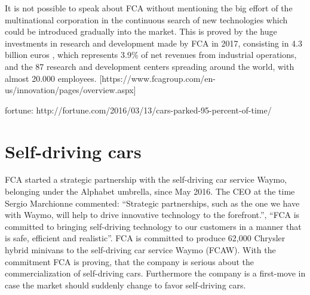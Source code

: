      

It is not possible to speak about FCA without mentioning the big effort of the multinational corporation in the continuous search of new technologies which could be introduced gradually into the market. 
This is proved by the huge investments in research and development made by FCA in 2017, consisting in 4.3 billion euros , which represents 3.9\% of net revenues from industrial operations, and the 87 research and development centers spreading around the world, with almost 20.000 employees. [https://www.fcagroup.com/en-us/innovation/pages/overview.aspx]



fortune: http://fortune.com/2016/03/13/cars-parked-95-percent-of-time/\section{Self-driving cars}

FCA started a strategic partnership with the self-driving car service Waymo, belonging under the Alphabet umbrella, since May 2016. The CEO at the time Sergio Marchionne commented: “Strategic partnerships, such as the one we have with Waymo, will help to drive innovative technology to the forefront.”, “FCA is committed to bringing self-driving technology to our customers in a manner that is safe, efficient and realistic”. FCA is committed to produce 62,000 Chrysler hybrid minivans to the self-driving car service Waymo (FCAW). With the commitment FCA is proving, that the company is serious about the commercialization of self-driving cars. Furthermore the company is a first-move in case the market should suddenly change to favor self-driving cars.

